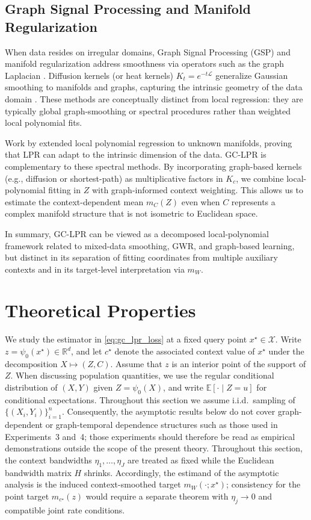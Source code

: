 \documentclass[final,1p,times,authoryear]{elsarticle}
\begin{document}
\subsection{Graph Signal Processing and Manifold Regularization}
When data resides on irregular domains, Graph Signal Processing (GSP) and manifold regularization address smoothness via operators such as the graph Laplacian \citep{shuman2013emerging}. Diffusion kernels (or heat kernels) $K_t = e^{-t\mathcal{L}}$ generalize Gaussian smoothing to manifolds and graphs, capturing the intrinsic geometry of the data domain \citep{kondor2002diffusion, belkin2003laplacian, coifman2006diffusion}. These methods are conceptually distinct from local regression: they are typically global graph-smoothing or spectral procedures rather than weighted local polynomial fits.

Work by \citet{bickel2007local} extended local polynomial regression to unknown manifolds, proving that LPR can adapt to the intrinsic dimension of the data. GC-LPR is complementary to these spectral methods. By incorporating graph-based kernels (e.g., diffusion or shortest-path) as multiplicative factors in $K_c$, we combine local-polynomial fitting in $Z$ with graph-informed context weighting. This allows us to estimate the context-dependent mean $m_C(Z)$ even when $C$ represents a complex manifold structure that is not isometric to Euclidean space.

In summary, GC-LPR can be viewed as a decomposed local-polynomial framework related to mixed-data smoothing, GWR, and graph-based learning, but distinct in its separation of fitting coordinates from multiple auxiliary contexts and in its target-level interpretation via $m_W$.


\section{Theoretical Properties}
\label{sec:theory}

We study the estimator in \eqref{eq:gc_lpr_loss} at a fixed query point \(x^\star\in\mathcal{X}\).
Write \(z=\psi_0(x^\star)\in\mathbb{R}^d\), and let \(c^\star\) denote the associated context value of \(x^\star\) under the decomposition \(X\mapsto (Z,C)\). Assume that \(z\) is an interior point of the support of \(Z\). When discussing population quantities,
we use the regular conditional distribution of \((X,Y)\) given \(Z=\psi_0(X)\), and write
\(\mathbb{E}[\cdot\mid Z=u]\) for conditional expectations.
Throughout this section we assume i.i.d.\ sampling of \(\{(X_i,Y_i)\}_{i=1}^n\). Consequently, the asymptotic results below do not cover graph-dependent or graph-temporal dependence structures such as those used in Experiments~3 and~4; those experiments should therefore be read as empirical demonstrations outside the scope of the present theory.
Throughout this section, the context bandwidths \(\eta_1,\ldots,\eta_J\) are treated as fixed while the Euclidean bandwidth matrix \(H\) shrinks. Accordingly, the estimand of the asymptotic analysis is the induced context-smoothed target \(m_W(\cdot;x^\star)\); consistency for the point target \(m_{c^\star}(z)\) would require a separate theorem with \(\eta_j\to0\) and compatible joint rate conditions.
\end{document}
